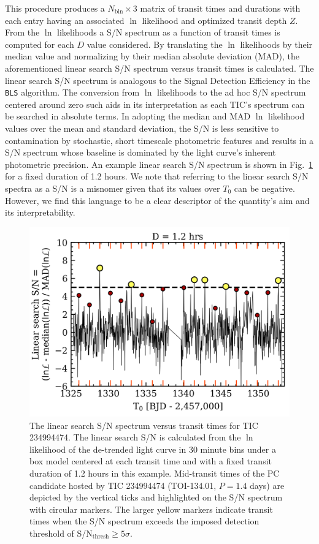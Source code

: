 This procedure produces a $N_{\text{bin}} \times 3$ matrix of transit times and durations
with each entry having an associated $\ln$ likelihood and optimized transit depth $Z$.
From the $\ln$ likelihoods a S/N spectrum as a function of transit times
is computed for each $D$ value considered. By translating the $\ln$ likelihoods by
their median value and normalizing by their median absolute deviation (MAD),
the aforementioned linear search S/N spectrum versus transit times is calculated.
The linear search S/N spectrum is analogous to the Signal Detection Efficiency in the
\texttt{BLS} algorithm. The conversion from
$\ln$ likelihoods to the ad hoc S/N spectrum centered around zero such aids in its interpretation as
each TIC's spectrum can be searched in absolute terms.
In adopting the median and MAD $\ln$ likelihood values over the mean and standard deviation, the S/N
is less sensitive to contamination by stochastic, short timescale photometric features
and results in a S/N spectrum whose baseline  is dominated by the light curve's
inherent photometric precision. An example linear search S/N spectrum is shown in
Fig.~\ref{fig:linearsearch} for a fixed duration of 1.2 hours. We note that referring to the
linear search S/N spectra as a S/N is a misnomer given that its values over $T_0$ can be negative.
However, we find this language to be a clear descriptor of the quantity's aim and its
interpretability.

\begin{figure}
  \centering
  \includegraphics[width=0.8\hsize]{figures/linearsearch_234994474.png}
  \caption[Results of the linear search for repeating transit-like events around TIC 234994474.]
      {The linear search S/N spectrum versus transit times for TIC 234994474.
    The linear search S/N is calculated from the $\ln$ likelihood of the de-trended light
    curve in 30 minute bins under a box model centered at each transit time and with a fixed
    transit duration of 1.2 hours in this example. Mid-transit times of the PC candidate
    hosted by TIC 234994474 (TOI-134.01, $P=1.4$ days) are depicted by the vertical ticks
    and highlighted on the S/N spectrum with circular markers. The larger yellow markers
    indicate transit times when the S/N spectrum exceeds the imposed \pipeline{}
    detection threshold of S/N$_{\text{thresh}}\geq 5\sigma$.}
  \label{fig:linearsearch}
\end{figure}

